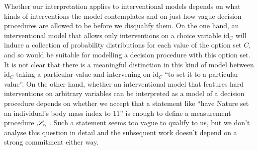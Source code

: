 Whether our interpretation applies to interventional models depends on what kinds of interventions the model contemplates and on just how vague decision procedures are allowed to be before we disqualify them. On the one hand, an interventional model that allows only interventions on a choice variable $\mathrm{id}_C$ will induce a collection of probability distributions for each value of the option set $C$, and so would be suitable for modelling a decision procedure with this option set. It is not clear that there is a meaningful distinction in this kind of model between $\mathrm{id}_C$ taking a particular value and intervening on $\mathrm{id}_C$ ``to set it to a particular value''. On the other hand, whether an interventional model that features hard interventions on arbitrary variables can be interpreted as a model of a decision procedure depends on whether we accept that a statement like ``have Nature set an individual's body mass index to $11$'' is enough to define a measurement procedure $\mathscr{S}_\alpha$ \citep{pearl_does_2018}. Such a statement seems too vague to qualify to us, but we don't analyse this question in detail and the subsequent work doesn't depend on a strong commitment either way.